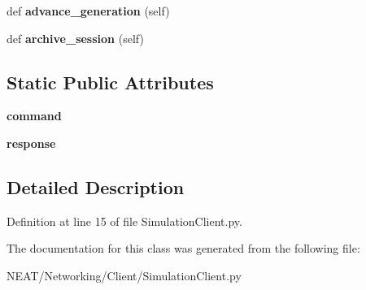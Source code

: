\begin{DoxyCompactItemize}
\item 
def {\bfseries advance\+\_\+generation} (self)\hypertarget{class_n_e_a_t___py_genetics_1_1_n_e_a_t_1_1_networking_1_1_client_1_1_simulation_client_1_1_simulation_client_a8aa37dad9f6092178fd4b08e654829ca}{}\label{class_n_e_a_t___py_genetics_1_1_n_e_a_t_1_1_networking_1_1_client_1_1_simulation_client_1_1_simulation_client_a8aa37dad9f6092178fd4b08e654829ca}

\item 
def {\bfseries archive\+\_\+session} (self)\hypertarget{class_n_e_a_t___py_genetics_1_1_n_e_a_t_1_1_networking_1_1_client_1_1_simulation_client_1_1_simulation_client_a2b90544554ffa9c9d884f68c9e4ec01b}{}\label{class_n_e_a_t___py_genetics_1_1_n_e_a_t_1_1_networking_1_1_client_1_1_simulation_client_1_1_simulation_client_a2b90544554ffa9c9d884f68c9e4ec01b}

\end{DoxyCompactItemize}
\subsection*{Static Public Attributes}
\begin{DoxyCompactItemize}
\item 
{\bfseries command}\hypertarget{class_n_e_a_t___py_genetics_1_1_n_e_a_t_1_1_networking_1_1_client_1_1_simulation_client_1_1_simulation_client_ae492ae862d9d7a5096f16051c4b43cb0}{}\label{class_n_e_a_t___py_genetics_1_1_n_e_a_t_1_1_networking_1_1_client_1_1_simulation_client_1_1_simulation_client_ae492ae862d9d7a5096f16051c4b43cb0}

\item 
{\bfseries response}\hypertarget{class_n_e_a_t___py_genetics_1_1_n_e_a_t_1_1_networking_1_1_client_1_1_simulation_client_1_1_simulation_client_a6a2ac9e9e4603999962e160328eaffce}{}\label{class_n_e_a_t___py_genetics_1_1_n_e_a_t_1_1_networking_1_1_client_1_1_simulation_client_1_1_simulation_client_a6a2ac9e9e4603999962e160328eaffce}

\end{DoxyCompactItemize}


\subsection{Detailed Description}


Definition at line 15 of file Simulation\+Client.\+py.



The documentation for this class was generated from the following file\+:\begin{DoxyCompactItemize}
\item 
N\+E\+A\+T/\+Networking/\+Client/Simulation\+Client.\+py\end{DoxyCompactItemize}

